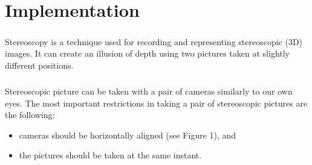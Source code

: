 \chapter{Implementation}
\paragraph{} Stereoscopy is a technique used for recording and representing stereoscopic (3D) images. It can create an illusion of depth using two pictures taken at slightly different positions.
\paragraph{} Stereoscopic picture can be taken with a pair of cameras similarly to our own eyes. The most important restrictions in taking a pair of stereoscopic pictures are the following:
\begin{itemize}
	\item cameras should be horizontally aligned (see Figure 1), and
	\item the pictures should be taken at the same instant.
\end{itemize}

